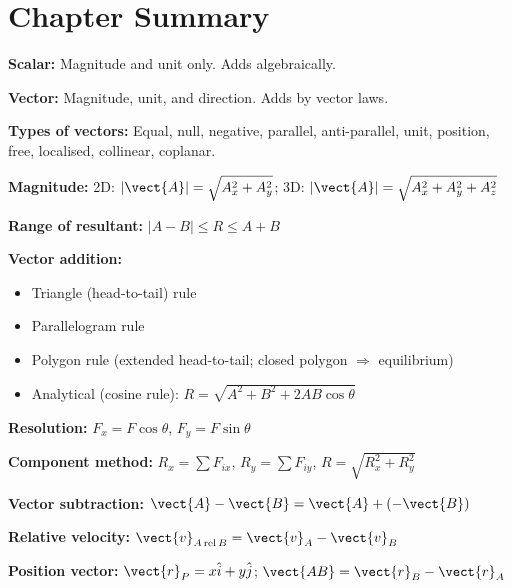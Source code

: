 \vspace{3.5cm}

\section{Chapter Summary}

\begin{summarybox}

\textbf{Scalar:} Magnitude and unit only. Adds algebraically.

\textbf{Vector:} Magnitude, unit, and direction. Adds
by vector laws.

\vspace{0.2cm}

\textbf{Types of vectors:} Equal, null, negative,
parallel, anti-parallel, unit, position, free,
localised, collinear, coplanar.

\vspace{0.2cm}

\textbf{Magnitude:}
2D: $|\vect{A}| = \sqrt{A_x^2+A_y^2}$;\quad
3D: $|\vect{A}| = \sqrt{A_x^2+A_y^2+A_z^2}$

\textbf{Range of resultant:}
$|A-B| \leq R \leq A+B$

\vspace{0.2cm}

\textbf{Vector addition:}
\begin{itemize}[noitemsep]
  \item Triangle (head-to-tail) rule
  \item Parallelogram rule
  \item Polygon rule (extended head-to-tail; closed
  polygon $\Rightarrow$ equilibrium)
  \item Analytical (cosine rule):
  $R = \sqrt{A^2+B^2+2AB\cos\theta}$
\end{itemize}

\textbf{Resolution:}
$F_x = F\cos\theta$, $F_y = F\sin\theta$

\textbf{Component method:}
$R_x = \sum F_{ix}$, $R_y = \sum F_{iy}$,
$R = \sqrt{R_x^2 + R_y^2}$

\textbf{Vector subtraction:}
$\vect{A}-\vect{B} = \vect{A}+(-\vect{B})$

\textbf{Relative velocity:}
$\vect{v}_{A\,\text{rel}\,B} = \vect{v}_A - \vect{v}_B$

\textbf{Position vector:}
$\vect{r}_P = x\hat{i}+y\hat{j}$;\quad
$\vect{AB} = \vect{r}_B - \vect{r}_A$


\end{summarybox}
